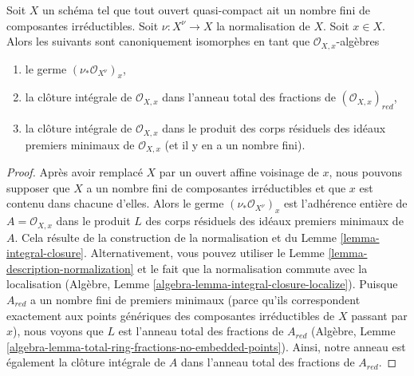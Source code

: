 \begin{lemma}
\label{lemma-stalk-normalization}
Soit $X$ un schéma tel que tout ouvert quasi-compact ait un nombre
fini de composantes irréductibles. Soit $\nu : X^\nu \to X$ la normalisation
de $X$. Soit $x \in X$. Alors les suivants sont
canoniquement isomorphes en tant que $\mathcal{O}_{X, x}$-algèbres
\begin{enumerate}
\item le germe $(\nu_*\mathcal{O}_{X^\nu})_x$,
\item la clôture intégrale de $\mathcal{O}_{X, x}$ dans
l'anneau total des fractions de $(\mathcal{O}_{X, x})_{red}$,
\item la clôture intégrale de $\mathcal{O}_{X, x}$ dans le produit
des corps résiduels des idéaux premiers minimaux de $\mathcal{O}_{X, x}$
(et il y en a un nombre fini).
\end{enumerate}
\end{lemma}

\begin{proof}
Après avoir remplacé $X$ par un ouvert affine
voisinage de $x$, nous pouvons supposer que $X$
a un nombre fini de composantes irréductibles
et que $x$ est contenu dans chacune d'elles.
Alors le germe $(\nu_*\mathcal{O}_{X^\nu})_x$ est l'adhérence entière de $A = \mathcal{O}_{X, x}$
dans le produit $L$ des corps résiduels
des idéaux premiers minimaux de $A$. Cela résulte
de la construction de la normalisation
et du Lemme \ref{lemma-integral-closure}.
Alternativement, vous pouvez utiliser
le Lemme \ref{lemma-description-normalization} et le fait que la normalisation
commute avec la localisation (Algèbre, Lemme \ref{algebra-lemma-integral-closure-localize}).
Puisque $A_{red}$ a un nombre fini de premiers minimaux
(parce qu'ils correspondent exactement aux points génériques
des composantes irréductibles de $X$ passant
par $x$), nous voyons que $L$ est l'anneau total
des fractions de $A_{red}$ (Algèbre, Lemme \ref{algebra-lemma-total-ring-fractions-no-embedded-points}). Ainsi, notre anneau est
également la clôture intégrale de $A$ dans l'anneau total
des fractions de $A_{red}$.
\end{proof}

